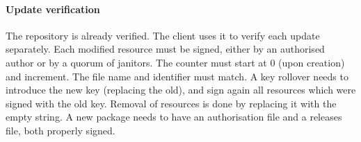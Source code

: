 \documentclass[nocopyrightspace]{sigplanconf}
\begin{document}
\paragraph{Update verification}  The repository is already verified.
The client uses it to verify each update separately.
Each modified resource must be signed, either by an authorised author or by a quorum of janitors.
The counter must start at 0 (upon creation) and increment.
The file name and identifier must match.
A key rollover needs to introduce the new key (replacing the old), and sign again all resources which were signed with the old key.
Removal of resources is done by replacing it with the empty string.
A new package needs to have an authorisation file and a releases file, both properly signed.
\end{document}
